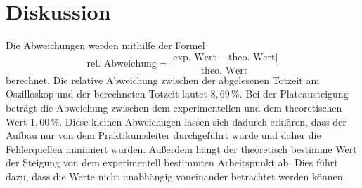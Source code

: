 \section{Diskussion}
\label{sec:Diskussion}
Die Abweichungen werden mithilfe der Formel
\begin{equation*}
    \text{rel. Abweichung} = \frac{|\text{exp. Wert} - \text{theo. Wert}|}{\text{theo. Wert}}
  \end{equation*}
berechnet. 
Die relative Abweichung zwischen der abgelesenen Totzeit am Oszilloskop und der berechneten Totzeit lautet $8,69\,\%$. 
Bei der Plateausteigung beträgt die Abweichung zwischen dem experimentellen und dem theoretischen Wert $1,00\,\%$. 
Diese kleinen Abweichugen lassen sich dadurch erklären, dass der Aufbau nur von dem Praktikumsleiter durchgeführt wurde und daher 
die Fehlerquellen minimiert wurden. Außerdem hängt der theoretisch bestimme Wert der Steigung von dem experimentell bestimmten Arbeitspunkt
ab. Dies führt dazu, dass die Werte nicht unabhängig voneinander betrachtet werden können.
